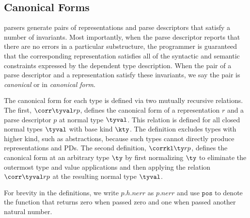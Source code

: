 \subsection{Canonical Forms}

\ddc{} parsers generate pairs of representations and parse descriptors
that satisfy a number of invariants.  Most importantly, 
when the parse descriptor reports that there are no errors in a
particular substructure, the programmer is guaranteed that the corresponding
representation satisfies all of the syntactic and semantic
constraints expressed by the dependent \ddc{} type description.  When
the pair of a parse descriptor and a representation satisfy these invariants, we say
the pair is {\em canonical} or in {\em canonical form}.

The canonical form for each \ddc{} type is defined via two
mutually recursive relations.  The first, $\corr \tyval r p$,
defines the canonical form of a representation $r$ and a parse
descriptor $p$ at normal type $\tyval$.  This relation is defined for all closed
normal types $\tyval$ with base kind $\kty$.  The definition excludes
types with higher kind, such as abstractions, because such types
cannot directly produce representations and PDs.
The second definition, $\corrkl \ty r p$, defines the canonical form
at an arbitrary type $\ty$ by first normalizing $\ty$ to eliminate the
outermost type and value applications and then
applying the relation $\corr \tyval r p$ at the resulting normal type $\tyval$.

For brevity in the definitions, we write $p.h.{nerr}$ as $p.{nerr}$ and use $\mathtt{pos}$ to
denote the function that returns zero when passed zero and one when
passed another natural number.

